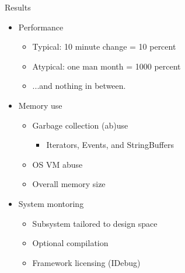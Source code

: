 \documentclass[%
final,
slideColor,
nototal,
nocolorBG,
pdf,
accumulate,
next,
]{prosper}
\begin{document}
\begin{slide}{Results}
  \begin{itemize}
  \item Performance
    \begin{itemize}
    \item Typical: 10 minute change = 10 percent
    \item Atypical: one man month = 1000 percent
    \item ...and nothing in between.
    \end{itemize}
  \item Memory use
    \begin{itemize}
    \item Garbage collection (ab)use
      \begin{itemize}
      \item Iterators, Events, and StringBuffers
      \end{itemize}
    \item OS VM abuse
    \item Overall memory size
    \end{itemize}
  \item System montoring
    \begin{itemize}
    \item Subsystem tailored to design space
    \item Optional compilation
    \item Framework licensing (IDebug)
    \end{itemize}
  \end{itemize}
\end{slide}
\end{document}
